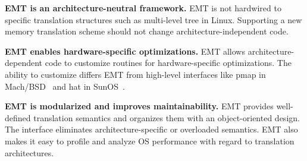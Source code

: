 \begin{packed_itemize}%
\item{\bf EMT is an architecture-neutral framework.}
EMT is not hardwired to specific translation structures such as
	multi-level tree in Linux.
Supporting a new memory translation scheme should not change %
	architecture-independent code.

\item{\bf EMT enables hardware-specific optimizations.}
EMT allows architecture-dependent code 
	to customize routines for hardware-specific optimizations.
	The ability to customize differs EMT from high-level interfaces like pmap in Mach/BSD~\cite{rashid1987machine}
	and hat in SunOS~\cite{gingell1987sunos}.


\item{\bf EMT is modularized and improves maintainability.}
EMT provides well-defined translation semantics and organizes them with an object-oriented design.
The interface eliminates architecture-specific or overloaded semantics. %
EMT also makes it easy to profile and analyze OS performance with regard to translation architectures.


\end{packed_itemize}
